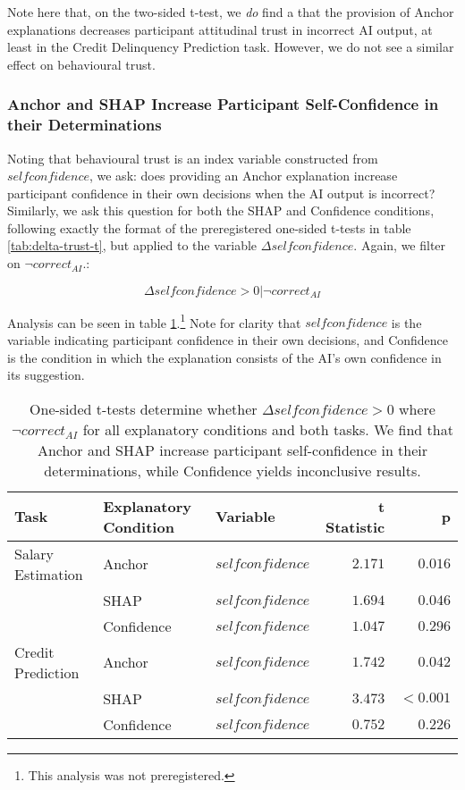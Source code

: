 Note here that, on the two-sided t-test, we \textit{do} find a that the provision of Anchor explanations decreases participant attitudinal trust in incorrect AI output, at least in the Credit Delinquency Prediction task. However, we do not see a similar effect on behavioural trust. 

\subsubsection{Anchor and SHAP Increase Participant Self-Confidence in their Determinations}
Noting that behavioural trust is an index variable constructed from $selfconfidence$, we ask: does providing an Anchor explanation increase participant confidence in their own decisions when the AI output is incorrect? Similarly, we ask this question for both the SHAP and Confidence conditions, following exactly the format of the preregistered one-sided t-tests in table \ref{tab:delta-trust-t}, but applied to the variable $\Delta selfconfidence$. Again, we filter on $\neg correct_{AI}$.:

\begin{equation}
    \Delta selfconfidence > 0 | \neg correct_{AI}
\end{equation}

Analysis can be seen in table \ref{tab:delta-confidence-t}.\footnote{This analysis was not preregistered.} Note for clarity that $selfconfidence$ is the variable indicating participant confidence in their own decisions, and Confidence is the condition in which the explanation consists of the AI's own confidence in its suggestion.

\begin{table}[htb]
    \caption{One-sided t-tests determine whether $\Delta selfconfidence > 0$ where $\neg correct_{AI}$ for all explanatory conditions and both tasks. We find that Anchor and SHAP increase participant self-confidence in their determinations, while Confidence yields inconclusive results.}
    \label{tab:delta-confidence-t}
    \begin{tabular}{lllrr}
        \toprule
        Task & Explanatory Condition & Variable & t Statistic & p \\
        \midrule
        Salary Estimation & Anchor & $selfconfidence$ & $\mathbf{2.171}$ & $\mathbf{0.016}$ \\
        & SHAP & $selfconfidence$ & $\mathbf{1.694}$ & $\mathbf{0.046}$ \\
        & Confidence & $selfconfidence$ & $1.047$ & $0.296$ \\
        \midrule
        Credit Prediction & Anchor & $selfconfidence$ & $\mathbf{1.742}$ & $\mathbf{0.042}$ \\
        & SHAP & $selfconfidence$ & $\mathbf{3.473}$ & $\mathbf{<0.001}$ \\
        & Confidence & $selfconfidence$ & $0.752$ & $0.226$ \\
        \bottomrule
    \end{tabular}
\end{table}

